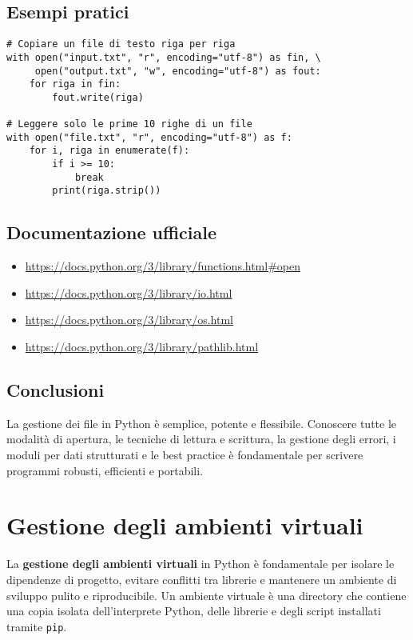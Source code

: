 \documentclass[a4paper,12pt]{article}
\begin{document}
\subsection*{Esempi pratici}
\begin{lstlisting}
# Copiare un file di testo riga per riga
with open("input.txt", "r", encoding="utf-8") as fin, \
     open("output.txt", "w", encoding="utf-8") as fout:
    for riga in fin:
        fout.write(riga)

# Leggere solo le prime 10 righe di un file
with open("file.txt", "r", encoding="utf-8") as f:
    for i, riga in enumerate(f):
        if i >= 10:
            break
        print(riga.strip())
\end{lstlisting}

\subsection*{Documentazione ufficiale}
\begin{itemize}
    \item \url{https://docs.python.org/3/library/functions.html#open}
    \item \url{https://docs.python.org/3/library/io.html}
    \item \url{https://docs.python.org/3/library/os.html}
    \item \url{https://docs.python.org/3/library/pathlib.html}
\end{itemize}

\subsection*{Conclusioni}
La gestione dei file in Python è semplice, potente e flessibile. Conoscere tutte le modalità di apertura, le tecniche di lettura e scrittura, la gestione degli errori, i moduli per dati strutturati e le best practice è fondamentale per scrivere programmi robusti, efficienti e portabili.

\section{Gestione degli ambienti virtuali}
La \textbf{gestione degli ambienti virtuali} in Python è fondamentale per isolare le dipendenze di progetto, evitare conflitti tra librerie e mantenere un ambiente di sviluppo pulito e riproducibile. Un ambiente virtuale è una directory che contiene una copia isolata dell'interprete Python, delle librerie e degli script installati tramite \texttt{pip}.
\end{document}
